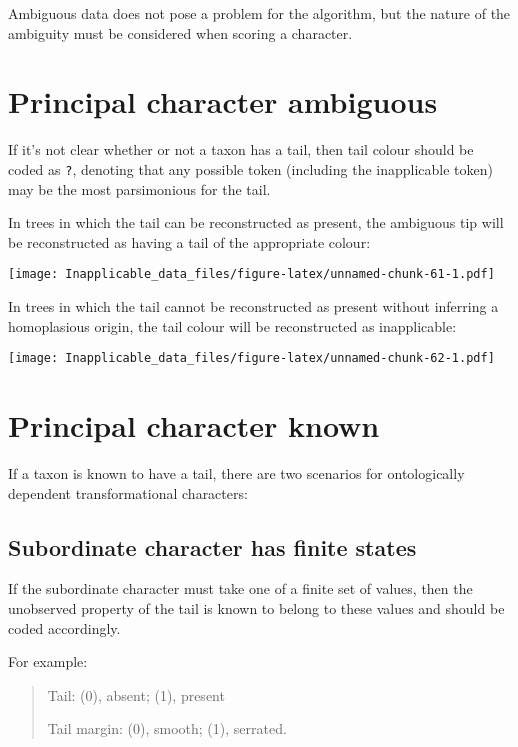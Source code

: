 \documentclass[]{book}
\theoremstyle{definition}
\theoremstyle{definition}
\theoremstyle{definition}
\theoremstyle{remark}
\begin{document}
Ambiguous data does not pose a problem for the algorithm, but the nature
of the ambiguity must be considered when scoring a character.

\hypertarget{principal-character-ambiguous}{%
\section{Principal character
ambiguous}\label{principal-character-ambiguous}}

If it's not clear whether or not a taxon has a tail, then tail colour
should be coded as \texttt{?}, denoting that any possible token
(including the inapplicable token) may be the most parsimonious for the
tail.

In trees in which the tail can be reconstructed as present, the
ambiguous tip will be reconstructed as having a tail of the appropriate
colour:

\texttt{[image: Inapplicable\_data\_files/figure-latex/unnamed-chunk-61-1.pdf]}

In trees in which the tail cannot be reconstructed as present without
inferring a homoplasious origin, the tail colour will be reconstructed
as inapplicable:

\texttt{[image: Inapplicable\_data\_files/figure-latex/unnamed-chunk-62-1.pdf]}

\hypertarget{principal-character-known}{%
\section{Principal character known}\label{principal-character-known}}

If a taxon is known to have a tail, there are two scenarios for
ontologically dependent transformational characters:

\hypertarget{subordinate-character-has-finite-states}{%
\subsection{Subordinate character has finite
states}\label{subordinate-character-has-finite-states}}

If the subordinate character must take one of a finite set of values,
then the unobserved property of the tail is known to belong to these
values and should be coded accordingly.

For example:

\begin{quote}
Tail: (0), absent; (1), present

Tail margin: (0), smooth; (1), serrated.
\end{quote}
\end{document}
